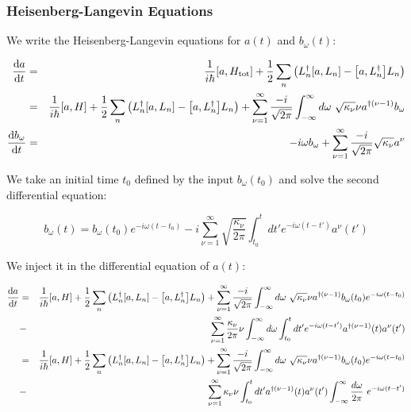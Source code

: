\subsubsection{Heisenberg-Langevin Equations}

We write the Heisenberg-Langevin equations for $a(t)$ and $b_\omega(t)$:

\begin{eqnarray}
    \timeDeriv{a} &=& \ihbar \commutator{a}{H_{\text{tot}}} + \frac{1}{2} \sum_n \left(L^\dagger_n \commutator{a}{L_n} - \commutator{a}{L^\dagger_n} L_n\right) \nonumber\\
    &=& \ihbar \commutator{a}{H} + \frac{1}{2} \sum_n \left(L^\dagger_n \commutator{a}{L_n} - \commutator{a}{L^\dagger_n} L_n\right) \nonumber + \sum_{\nu = 1}^\infty \frac{-i}{\sqrt{2 \pi}} \int_{-\infty}^\infty d\omega \ \sqrt{\kappa_\nu} \nu a^{\dagger (\nu-1)} b_\omega\\
    \timeDeriv{b_\omega} &=& -i \omega b_\omega + \sum_{\nu = 1}^\infty \frac{-i}{\sqrt{2 \pi}} \sqrt{\kappa_\nu} a^\nu
\end{eqnarray}

We take an initial time $t_0$ defined by the input $b_\omega(t_0)$ and solve the second differential equation:

\begin{equation}
    b_\omega(t) = b_\omega(t_0) e^{-i \omega (t - t_0)} - i \sum_{\nu = 1}^\infty \sqrt{\frac{\kappa_\nu}{2 \pi}} \int_{t_0}^t dt' e^{-i \omega (t - t')} a^\nu(t')
\end{equation}

We inject it in the differential equation of $a(t)$:

\begin{eqnarray}
    \timeDeriv{a} &=& \ihbar \commutator{a}{H} + \frac{1}{2} \sum_n \left(L^\dagger_n \commutator{a}{L_n} - \commutator{a}{L^\dagger_n} L_n\right) + \sum_{\nu = 1}^\infty \frac{-i}{\sqrt{2 \pi}} \int_{-\infty}^\infty d\omega \ \sqrt{\kappa_\nu} \nu a^{\dagger (\nu-1)} b_\omega(t_0) e^{-i \omega (t - t_0)} \nonumber\\
    &-& \sum_{\nu = 1}^\infty \frac{\kappa_\nu}{2 \pi} \nu \int_{-\infty}^\infty d\omega \int_{t_0}^t dt' e^{-i \omega (t - t')} a^{\dagger (\nu-1)}(t) a^\nu(t')\nonumber\\
    &=& \ihbar \commutator{a}{H} + \frac{1}{2} \sum_n \left(L^\dagger_n \commutator{a}{L_n} - \commutator{a}{L^\dagger_n} L_n\right) + \sum_{\nu = 1}^\infty \frac{-i}{\sqrt{2 \pi}} \int_{-\infty}^\infty d\omega \ \sqrt{\kappa_\nu} \nu a^{\dagger (\nu-1)} b_\omega(t_0) e^{-i \omega (t - t_0)} \nonumber\\
    &-& \sum_{\nu = 1}^\infty \kappa_\nu\nu  \int_{t_0}^t dt' a^{\dagger (\nu-1)}(t) a^\nu(t') \int_{-\infty}^\infty \frac{d\omega}{2 \pi} \ e^{-i \omega (t - t')}
\end{eqnarray}

